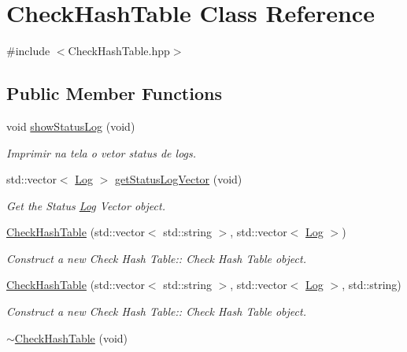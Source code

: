 \hypertarget{class_check_hash_table}{}\section{Check\+Hash\+Table Class Reference}
\label{class_check_hash_table}


{\ttfamily \#include $<$Check\+Hash\+Table.\+hpp$>$}

\subsection*{Public Member Functions}
\begin{DoxyCompactItemize}
\item 
void \hyperlink{class_check_hash_table_a976b114162765decaa1c7fe0b8e16cf8}{show\+Status\+Log} (void)
\begin{DoxyCompactList}\small\item\em Imprimir na tela o vetor status de logs. \end{DoxyCompactList}\item 
std\+::vector$<$ \hyperlink{class_log}{Log} $>$ \hyperlink{class_check_hash_table_ac57b97e1bf321ea232370d1ae0da3a55}{get\+Status\+Log\+Vector} (void)
\begin{DoxyCompactList}\small\item\em Get the Status \hyperlink{class_log}{Log} Vector object. \end{DoxyCompactList}\item 
\hyperlink{class_check_hash_table_a4e5be4b9a124cbf72c8f06d63e6ffca5}{Check\+Hash\+Table} (std\+::vector$<$ std\+::string $>$, std\+::vector$<$ \hyperlink{class_log}{Log} $>$)
\begin{DoxyCompactList}\small\item\em Construct a new Check Hash Table\+:\+: Check Hash Table object. \end{DoxyCompactList}\item 
\hyperlink{class_check_hash_table_a64c43b1e671248aa466b3310471d3d96}{Check\+Hash\+Table} (std\+::vector$<$ std\+::string $>$, std\+::vector$<$ \hyperlink{class_log}{Log} $>$, std\+::string)
\begin{DoxyCompactList}\small\item\em Construct a new Check Hash Table\+:\+: Check Hash Table object. \end{DoxyCompactList}\item 
\hyperlink{class_check_hash_table_ae7cb5a5c4a6ef08a073010f104c3f9df}{$\sim$\+Check\+Hash\+Table} (void)
\end{DoxyCompactItemize}



